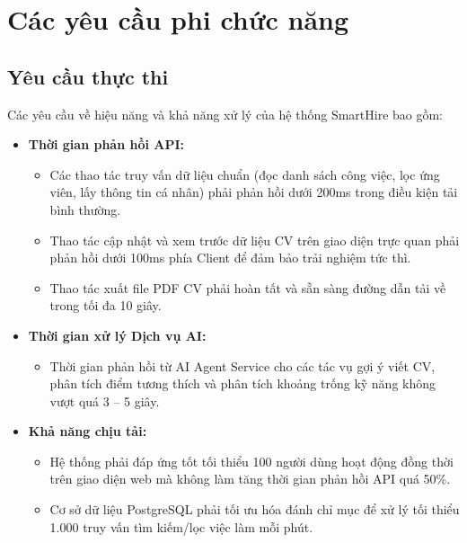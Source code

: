 
\clearpage

\section{Các yêu cầu phi chức năng}

\subsection{Yêu cầu thực thi}

Các yêu cầu về hiệu năng và khả năng xử lý của hệ thống SmartHire bao gồm:

\begin{itemize}
    \item \textbf{Thời gian phản hồi API:}
    \begin{itemize}
        \item Các thao tác truy vấn dữ liệu chuẩn (đọc danh sách công việc, lọc ứng viên, lấy thông tin cá nhân) phải phản hồi dưới 200ms trong điều kiện tải bình thường.
        \item Thao tác cập nhật và xem trước dữ liệu CV trên giao diện trực quan phải phản hồi dưới 100ms phía Client để đảm bảo trải nghiệm tức thì.
        \item Thao tác xuất file PDF CV phải hoàn tất và sẵn sàng đường dẫn tải về trong tối đa 10 giây.
    \end{itemize}

    \item \textbf{Thời gian xử lý Dịch vụ AI:}
    \begin{itemize}
        \item Thời gian phản hồi từ AI Agent Service cho các tác vụ gợi ý viết CV, phân tích điểm tương thích và phân tích khoảng trống kỹ năng không vượt quá 3 -- 5 giây.
    \end{itemize}

    \item \textbf{Khả năng chịu tải:}
    \begin{itemize}
        \item Hệ thống phải đáp ứng tốt tối thiểu 100 người dùng hoạt động đồng thời trên giao diện web mà không làm tăng thời gian phản hồi API quá 50\%.
        \item Cơ sở dữ liệu PostgreSQL phải tối ưu hóa đánh chỉ mục để xử lý tối thiểu 1.000 truy vấn tìm kiếm/lọc việc làm mỗi phút.
    \end{itemize}
\end{itemize}

